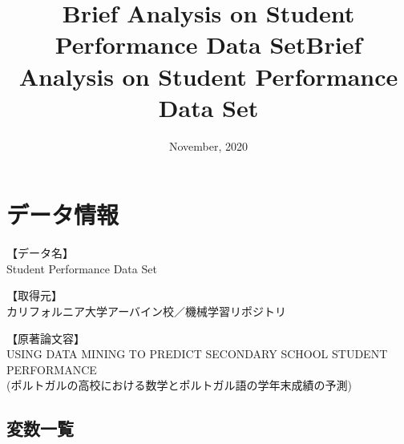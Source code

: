 \documentclass[9pt]{ltjsarticle}
\title{Brief Analysis on Student Performance Data Set}
\title{\textbf{Brief Analysis on Student Performance Data Set} }
\date{November, 2020}
\begin{document}
    
    \maketitle

\tableofcontents

    

    
    \hypertarget{ux30c7ux30fcux30bfux60c5ux5831}{%
\section{データ情報}\label{ux30c7ux30fcux30bfux60c5ux5831}}

【データ名】\\ Student Performance Data Set

【取得元】\\ カリフォルニア大学アーバイン校／機械学習リポジトリ\cite{uci}

【原著論文容】\\USING DATA MINING TO PREDICT SECONDARY SCHOOL STUDENT PERFORMANCE \cite{cortez}
 \\
(ポルトガルの高校における数学とポルトガル語の学年末成績の予測)
\newpage
    \hypertarget{ux5909ux6570ux4e00ux89a7}{%
\subsection{変数一覧}\label{ux5909ux6570ux4e00ux89a7}}
\end{document}
